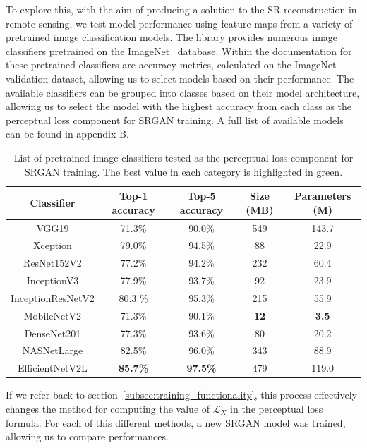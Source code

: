 To explore this, with the aim of producing a solution to the SR reconstruction in remote sensing, we test model performance using feature maps from a variety of pretrained image classification models. The  library provides numerous image classifiers pretrained on the ImageNet~\cite{imageNet} database. Within the documentation for these pretrained classifiers are accuracy metrics, calculated on the ImageNet validation dataset, allowing us to select models based on their performance. The available classifiers can be grouped into classes based on their model architecture, allowing us to select the model with the highest accuracy from each class as the perceptual loss component for SRGAN training. A full list of available models can be found in appendix B.
\begin{table}
    \centering
    \begin{tabular}{ccccc}
        \toprule
        \textbf{Classifier} & \textbf{Top-1 accuracy} & \textbf{Top-5 accuracy} & \textbf{Size (MB)} & \textbf{Parameters (M)} \\
        \midrule
        VGG19 & 71.3\% & 90.0\% & 549 & 143.7 \\
        Xception & 79.0\% & 94.5\% & 88 & 22.9 \\
        ResNet152V2 & 77.2\% & 94.2\% & 232 & 60.4 \\
        InceptionV3 & 77.9\% & 93.7\% & 92 & 23.9 \\
        InceptionResNetV2 & 80.3 \% & 95.3\% & 215 & 55.9 \\
        MobileNetV2 & 71.3\% & 90.1\% & \textbf{12} & \textbf{3.5} \\
        DenseNet201 & 77.3\% & 93.6\% & 80 & 20.2 \\
        NASNetLarge & 82.5\% & 96.0\% & 343 & 88.9 \\
    EfficientNetV2L & \textbf{85.7\%} & \textbf{97.5\%} & 479 & 119.0 \\
        \bottomrule
    \end{tabular}
    \caption{List of pretrained image classifiers tested as the perceptual loss component for SRGAN training. The best value in each category is highlighted in green.}\label{table:pretrained_classifiers}
\end{table}

If we refer back to section~\ref{subsec:training_functionality}, this process effectively changes the method for computing the value of $\mathcal{L}_X$ in the perceptual loss formula. For each of this different methods, a new SRGAN model was trained, allowing us to compare performances.

